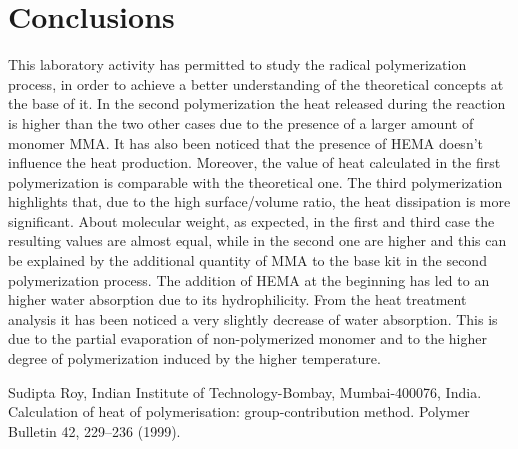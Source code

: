 \documentclass[a4paper, 11pt]{article}
\begin{document}
\section{Conclusions}

This laboratory activity has permitted to study the radical polymerization process, in order to achieve a better understanding of the theoretical concepts at the base of it.
In the second polymerization the heat released during the reaction is higher than the two other cases due to the presence of a larger amount of monomer MMA. It has also been noticed that the presence of HEMA doesn't influence the heat production. Moreover, the value of heat calculated in the first polymerization is comparable with the theoretical one. The third polymerization highlights that, due to the high surface/volume ratio, the heat dissipation is more significant. About molecular weight, as expected, in the first and third case the resulting values are almost equal, while in the second one are higher and this can be explained by the additional quantity of MMA to the base kit in the second polymerization process. The addition of HEMA at the beginning has led to an higher water absorption due to its hydrophilicity. From the heat treatment analysis it has been noticed a very slightly decrease of water absorption. This is due to the partial evaporation of non-polymerized monomer and to the higher degree of polymerization induced by the higher temperature.


\newpage
\thispagestyle{empty}


\begin{thebibliography}{11}

 Sudipta Roy, Indian Institute of Technology-Bombay, Mumbai-400076, India. Calculation of heat of polymerisation: group-contribution method. Polymer Bulletin 42, 229–236 (1999).

\end{thebibliography}
\end{document}
